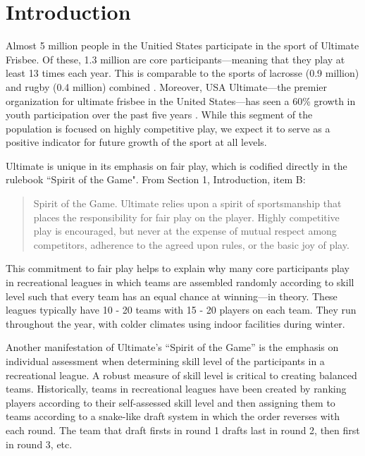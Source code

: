 \href{http://}{}\section{Introduction}\label{sec:introduction}

Almost 5 million people in the Unitied States participate in the sport of Ultimate Frisbee.  Of these, 1.3 million are core participants---meaning that they play at least 13 times each year.  This is comparable to the sports of lacrosse (0.9 million) and rugby (0.4 million) combined \cite{sfia_2016}. Moreover, USA Ultimate---the premier organization for ultimate frisbee in the United States---has seen a 60\% growth in youth participation over the past five years \cite{usau_2016}.  While this segment of the population is focused on highly competitive play, we expect it to serve as a positive indicator for future growth of the sport at all levels.

Ultimate is unique in its emphasis on fair play, which is codified directly in the rulebook ``Spirit of the Game".  From Section 1, Introduction, item B:

\begin{quote} Spirit of the Game. Ultimate relies upon a spirit of sportsmanship that places the responsibility for fair play on the player. Highly competitive play is encouraged, but never at the expense of mutual respect among competitors, adherence to the agreed upon rules, or the basic joy of play.
\end{quote}

This commitment to fair play helps to explain why many core participants play in recreational leagues in which teams are assembled randomly according to skill level such that every team has an equal chance at winning---in theory.  These leagues typically have 10 - 20 teams with 15 - 20 players on each team.  They run throughout the year, with colder climates using indoor facilities during winter.

Another manifestation of Ultimate's ``Spirit of the Game'' is the emphasis on individual assessment when determining skill level of the participants in a recreational league.  A robust measure of skill level is critical to creating balanced teams.  Historically, teams in recreational leagues have been created by ranking players according to their self-assessed skill level and then assigning them to teams according to a snake-like draft system in which the order reverses with each round.  The team that draft firsts in round 1 drafts last in round 2, then first in round 3, etc.

